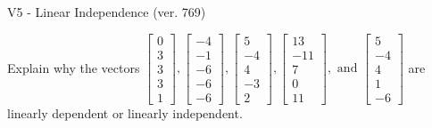 \begin{exercise}
  \begin{exerciseTitle}V5 - Linear Independence (ver. 769)\end{exerciseTitle}
  \begin{exerciseStatement}
    Explain why the vectors \(\left[\begin{array}{r}
0 \\
3 \\
3 \\
3 \\
1
\end{array}\right] , \left[\begin{array}{r}
-4 \\
-1 \\
-6 \\
-6 \\
-6
\end{array}\right] , \left[\begin{array}{r}
5 \\
-4 \\
4 \\
-3 \\
2
\end{array}\right] , \left[\begin{array}{r}
13 \\
-11 \\
7 \\
0 \\
11
\end{array}\right] , \text{ and } \left[\begin{array}{r}
5 \\
-4 \\
4 \\
1 \\
-6
\end{array}\right]\) are linearly dependent or linearly independent.	



\end{exerciseStatement}
\end{exercise}
